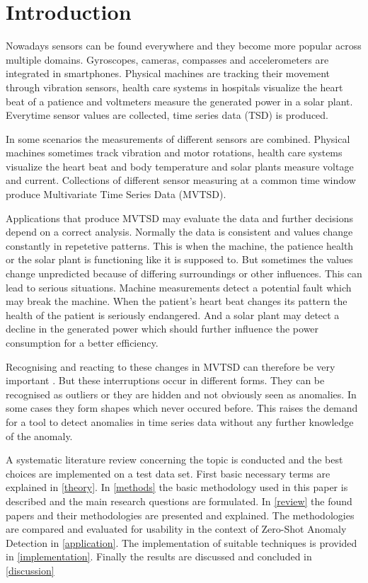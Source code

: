 \section{Introduction}\label{intro}
Nowadays sensors can be found everywhere and they become more popular across multiple domains. Gyroscopes, cameras, compasses and accelerometers are integrated in smartphones. Physical machines are tracking their movement through vibration sensors, health care systems in hospitals visualize the heart beat of a patience and voltmeters measure the generated power in a solar plant. Everytime sensor values are collected, time series data (TSD) is produced.

In some scenarios the measurements of different sensors are combined. Physical machines sometimes track vibration and motor rotations, health care systems visualize the heart beat and body temperature and solar plants measure voltage and current.
Collections of different sensor measuring at a common time window produce Multivariate Time Series Data (MVTSD).

Applications that produce MVTSD may evaluate the data and further decisions depend on a correct analysis.
Normally the data is consistent and values change constantly in repetetive patterns. This is when the machine, the patience health or the solar plant is functioning like it is supposed to. But sometimes the values change unpredicted because of differing surroundings or other influences. This can lead to serious situations. Machine measurements detect a potential fault which may break the machine. When the patient's heart beat changes its pattern the health of the patient is seriously endangered. And a solar plant may detect a decline in the generated power which should further influence the power consumption for a better efficiency.

Recognising and reacting to these changes in MVTSD can therefore be very important%
. But these interruptions occur in different forms. They can be recognised as outliers or they are hidden and not obviously seen as anomalies. In some cases they form shapes which never occured before. This raises the demand for a tool to detect anomalies in time series data without any further knowledge of the anomaly.


A systematic literature review concerning the topic is conducted and the best choices are implemented on a test data set. First basic necessary terms are explained in \autoref{theory}. In \autoref{methods} the basic methodology used in this paper is described and the main research questions are formulated. In \autoref{review} the found papers and their methodologies are presented and explained. The methodologies are compared and evaluated for usability in the context of Zero-Shot Anomaly Detection in \autoref{application}. The implementation of suitable techniques is provided in \autoref{implementation}. Finally the results are discussed and concluded in \autoref{discussion}
